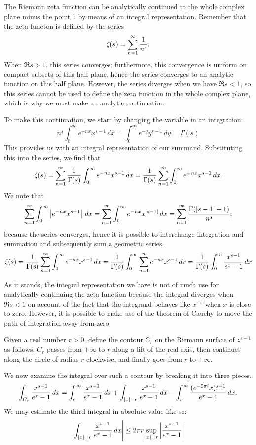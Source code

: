 \documentclass[12pt]{article}
\begin{document}
The Riemann zeta function can be analytically 
continued to the whole complex plane minus the point 1
by means of an integral representation.  Remember that the zeta functon
is defined by the series
\[
\zeta (s) = \sum_{n=1}^\infty {1 \over n^s}.
\]
When $\Re s > 1$, this series converges; furthermore, this convergence is 
uniform on compact subsets of this half-plane, hence the series converges to
an analytic function on this half plane.  However, the series diverges when 
we have $\Re s < 1$, so this series cannot be used to define the zeta function
in the whole complex plane, which is why we must make an analytic continuation.

To make this continuation, we start by changing the variable in an integration:
\[
n^s \int_0^{\infty} e^{-nx} x^{s-1} \, dx =
\int_0^{\infty} e^{-y} y^{s-1} \, dy = 
\Gamma (s)
\]
This provides us with an integral representation of our summand.  
Substituting this into the series, we find that
\[
\zeta (s) = \sum_{n=1}^\infty
{1 \over \Gamma(s)} \int_0^{\infty} e^{-nx} x^{s-1} \, dx =
{1 \over \Gamma(s)}
\sum_{n=1}^\infty \int_0^{\infty}
e^{-nx} x^{s-1} \, dx.
\]
We note that
\[
\sum_{n=1}^\infty \int_0^{\infty}
\left| e^{-nx} x^{s-1} \right| \, dx =
\sum_{n=1}^\infty \int_0^{\infty}
e^{-nx} x^{|s-1|} \, dx =
\sum_{n=1}^\infty {\Gamma (|s - 1| + 1) \over n^s};
\]
because the series converges, hence it is possible
to interchange integration and summation and
subsequently sum a geometric series.
\[
\zeta(s) = {1 \over \Gamma (s)}
\sum_{n=1}^\infty \int_0^{\infty}
e^{-nx} x^{s-1} \, dx =
{1 \over \Gamma (s)}
\int_0^{\infty} \sum_{n=1}^\infty
e^{-nx} x^{s-1} \, dx =
{1 \over \Gamma (s)}
\int_0^{\infty} 
{x^{s-1} \over e^x - 1} \, dx
\]

As it stands, the integral representation we have is not of
much use for analytically continuing the zeta function 
because the integral diverges when $\Re s < 1$ on account of 
the fact that the integrand behaves like $x^{-s}$ when $x$
is close to zero.  However, it is possible to make use of the
theorem of Cauchy to move the path of integration away from
zero.

Given a real number $r > 0$, define the contour $C_r$ on the
Riemann surface of $z^{s-1}$ as follows: $C_r$ passes from
$+\infty$ to $r$ along a lift of the real axis, then continues 
along the circle of radius $r$ clockwise, and finally goes
from $r$ to $+\infty$.  

We now examine the integral over such a contour by breaking it 
into three pieces.
\[
\int_{C_r}
{x^{s-1} \over e^x - 1} \, dx =
\int_r^\infty 
{x^{s-1} \over e^x - 1} \, dx +
\int_{|x| = r}
{x^{s-1} \over e^x - 1} \, dx -
\int_r^\infty 
{(e^{-2 \pi i}x)^{s-1} \over e^x - 1} \, dx.
\]
We may estimate the third integral in absolute value like so:
\[
\left| \int_{|x| = r}
{x^{s-1} \over e^x - 1} \, dx \right| \le
2 \pi  r \sup_{|x| = r}
\left| {x^{s-1} \over e^x - 1} \right|
\]
\end{document}
